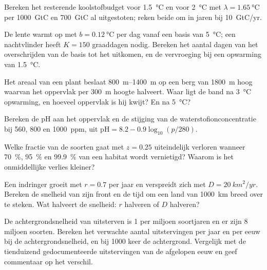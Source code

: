 \begin{exercise}[$\star\star$]\label{exo:b2:global-change:5}
Bereken het resterende koolstofbudget voor \qty{1.5}{\celsius} en voor
\qty{2}{\celsius} met $\lambda = \qty{1.65}{\celsius}$ per
\qty{1000}{GtC} en \qty{700}{GtC} al uitgestoten; reken beide om in
jaren bij \qty{10}{GtC/yr}.
\end{exercise}

\begin{exercise}[$\star\star$]\label{exo:b2:global-change:6}
De lente warmt op met $b = \qty{0.12}{\celsius}$ per dag vanaf een basis van
\qty{5}{\celsius}; een nachtvlinder heeft $K = 150$ graaddagen nodig. Bereken
het aantal dagen van het overschrijden van de basis tot het uitkomen, en de
vervroeging bij een opwarming van \qty{1.5}{\celsius}.
\end{exercise}

\begin{exercise}[$\star\star$]\label{exo:b2:global-change:7}
Het areaal van een plant beslaat \qtyrange{800}{1400}{m} op een berg van
\qty{1800}{m} hoog waarvan het oppervlak per \qty{300}{m} hoogte halveert.
Waar ligt de band na \qty{3}{\celsius} opwarming, en hoeveel oppervlak is hij
kwijt? En na \qty{5}{\celsius}?
\end{exercise}

\begin{exercise}[$\star\star$]\label{exo:b2:global-change:8}
Bereken de pH aan het oppervlak en de stijging van de waterstofionconcentratie
bij 560, 800 en \qty{1000}{ppm}, uit $\mathrm{pH} = 8.2 -
0.9\log_{10}(p/280)$.
\end{exercise}

\begin{exercise}[$\star\star$]\label{exo:b2:global-change:9}
Welke fractie van de soorten gaat met $z = 0.25$ uiteindelijk verloren wanneer
\qty{70}{\%}, \qty{95}{\%} en \qty{99.9}{\%} van een habitat wordt
vernietigd? Waarom is het onmiddellijke verlies kleiner?
\end{exercise}

\begin{exercise}[$\star\star\star$]\label{exo:b2:global-change:10}
Een indringer groeit met $r = 0.7$ per jaar en verspreidt zich met $D =
\qty{20}{km^2/yr}$. Bereken de snelheid van zijn front en de tijd om een
land van \qty{1000}{km} breed over te steken. Wat halveert de snelheid: $r$
halveren of $D$ halveren?
\end{exercise}

\begin{exercise}[$\star\star\star$]\label{exo:b2:global-change:11}
De achtergrondsnelheid van uitsterven is 1 per miljoen soortjaren en
er zijn 8 miljoen soorten. Bereken het verwachte aantal uitstervingen per
jaar en per eeuw bij de achtergrondsnelheid, en bij 1000 keer de achtergrond.
Vergelijk met de tienduizend gedocumenteerde uitstervingen van de afgelopen
eeuw en geef commentaar op het verschil.
\end{exercise}

